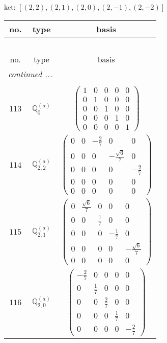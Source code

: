 \documentclass[fleqn,8pt,landscape]{jsarticle}
\begin{document}
\noindent
ket: $[(2,2),(2,1),(2,0),(2,-1),(2,-2)]$
\begin{center}
\renewcommand{\arraystretch}{1.6}
\begin{longtable}{ccc}
 \hline \hline
no. & type & basis \\ \hline \endfirsthead

\multicolumn{2}{l}{\tablename\ \thetable{}} \\
 \hline \hline
no. & type & basis \\ \hline \endhead

 \hline \hline
\multicolumn{2}{r}{\footnotesize\it continued ...} \\ \endfoot

 \hline \hline
\multicolumn{2}{r}{} \\ \endlastfoot

$ 113 $ & $ \mathbb{Q}_{0}^{(a)} $ & $ \begin{pmatrix} 1 & 0 & 0 & 0 & 0 \\ 0 & 1 & 0 & 0 & 0 \\ 0 & 0 & 1 & 0 & 0 \\ 0 & 0 & 0 & 1 & 0 \\ 0 & 0 & 0 & 0 & 1 \end{pmatrix} $ \\ \hline
$ 114 $ & $ \mathbb{Q}_{2,2}^{(a)} $ & $ \begin{pmatrix} 0 & 0 & - \frac{2}{7} & 0 & 0 \\ 0 & 0 & 0 & - \frac{\sqrt{6}}{7} & 0 \\ 0 & 0 & 0 & 0 & - \frac{2}{7} \\ 0 & 0 & 0 & 0 & 0 \\ 0 & 0 & 0 & 0 & 0 \end{pmatrix} $ \\ \hline
$ 115 $ & $ \mathbb{Q}_{2,1}^{(a)} $ & $ \begin{pmatrix} 0 & \frac{\sqrt{6}}{7} & 0 & 0 & 0 \\ 0 & 0 & \frac{1}{7} & 0 & 0 \\ 0 & 0 & 0 & - \frac{1}{7} & 0 \\ 0 & 0 & 0 & 0 & - \frac{\sqrt{6}}{7} \\ 0 & 0 & 0 & 0 & 0 \end{pmatrix} $ \\ \hline
$ 116 $ & $ \mathbb{Q}_{2,0}^{(a)} $ & $ \begin{pmatrix} - \frac{2}{7} & 0 & 0 & 0 & 0 \\ 0 & \frac{1}{7} & 0 & 0 & 0 \\ 0 & 0 & \frac{2}{7} & 0 & 0 \\ 0 & 0 & 0 & \frac{1}{7} & 0 \\ 0 & 0 & 0 & 0 & - \frac{2}{7} \end{pmatrix} $ \\ \hline

\end{longtable}
\end{center}
\end{document}
